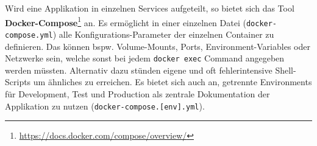 \par
Wird eine Applikation in einzelnen Services aufgeteilt, so bietet sich das Tool \textbf{Docker-Compose}\footnote{\url{https://docs.docker.com/compose/overview/}} an.
Es ermöglicht in einer einzelnen Datei (\texttt{docker-compose.yml}) alle Konfigurations-Parameter der einzelnen Container zu definieren.
Das können \ac{bspw.} Volume-Mounts, Ports, Environment-Variables oder Netzwerke sein, welche sonst bei jedem \texttt{docker exec} Command angegeben werden müssten.
Alternativ dazu stünden eigene und oft fehlerintensive Shell-Scripts um ähnliches zu erreichen. 
Es bietet sich auch an, getrennte Environments für Development, Test und Production als zentrale Dokumentation der Applikation zu nutzen (\texttt{docker-compose.[env].yml}).

